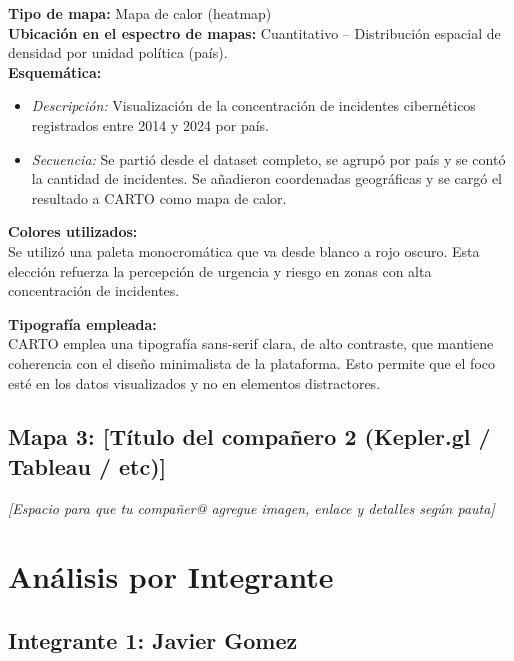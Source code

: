 \documentclass[12pt, a4paper]{article}
\begin{document}
\textbf{Tipo de mapa:} Mapa de calor (heatmap) \\
\textbf{Ubicación en el espectro de mapas:} Cuantitativo – Distribución espacial de densidad por unidad política (país). \\

\textbf{Esquemática:} \\
\begin{itemize}
    \item \textit{Descripción:} Visualización de la concentración de incidentes cibernéticos registrados entre 2014 y 2024 por país.
    \item \textit{Secuencia:} Se partió desde el dataset completo, se agrupó por país y se contó la cantidad de incidentes. Se añadieron coordenadas geográficas y se cargó el resultado a CARTO como mapa de calor.
\end{itemize}

\textbf{Colores utilizados:} \\
Se utilizó una paleta monocromática que va desde blanco a rojo oscuro. Esta elección refuerza la percepción de urgencia y riesgo en zonas con alta concentración de incidentes.

\textbf{Tipografía empleada:} \\
CARTO emplea una tipografía sans-serif clara, de alto contraste, que mantiene coherencia con el diseño minimalista de la plataforma. Esto permite que el foco esté en los datos visualizados y no en elementos distractores.



\vspace{1em}
\subsection*{Mapa 3: [Título del compañero 2 (Kepler.gl / Tableau / etc)]}
\textit{[Espacio para que tu compañer@ agregue imagen, enlace y detalles según pauta]}


\section*{Análisis por Integrante}

\subsection*{Integrante 1: Javier Gomez}
\end{document}
